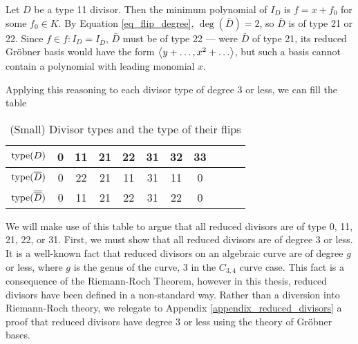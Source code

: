 \begin{example}
  Let $D$ be a type 11 divisor.
  Then the minimum polynomial of $I_D$ is $f = x + f_0$ for some $f_0 \in K$.
  By Equation \ref{eq_flip_degree}, $\deg(\bar D) = 2$, so $\bar D$ is of type 21 or 22.
  Since $f \in f : I_D = I_{\bar D}$, $\bar D$ must be of type 22 ---
  were $\bar D$ of type 21, its reduced Gr\"obner basis would have the form $\left\langle y + \ldots, x^2 + \ldots \right\rangle$,
  but such a basis cannot contain a polynomial with leading monomial $x$.
\end{example}

Applying this reasoning to each divisor type of degree 3 or less,
we can fill the table
\begin{table}[h]
\caption{(Small) Divisor types and the type of their flips}
\label{tab_small_flip_type}
\begin{center}
  \begin{tabular}{r|cccccccccc}
    $\operatorname{type}(D)$             & 0 & 11 & 21 & 22 & 31 & 32 & 33 \\
    \hline
    $\operatorname{type}(\overline D)$        & 0 & 22 & 21 & 11 & 31 & 11 & 0 \\
    $\operatorname{type}(\overline {\overline D})$ & 0 & 11 & 21 & 22 & 31 & 22 & 0
  \end{tabular}
\end{center}
\end{table}

We will make use of this table to argue that all reduced divisors are of type 0, 11, 21, 22, or 31.
First, we must show that all reduced divisors are of degree 3 or less.
It is a well-known fact that reduced divisors on an algebraic curve are of degree $g$ or less,
where $g$ is the genus of the curve, 3 in the $C_{3,4}$ curve case.
This fact is a consequence of the Riemann-Roch Theorem,
however in this thesis, reduced divisors have been defined in a non-standard way.
Rather than a diversion into Riemann-Roch theory,
we relegate to Appendix \ref{appendix_reduced_divisors}
a proof that reduced divisors have degree 3 or less using the theory of Gr\"obner bases.

